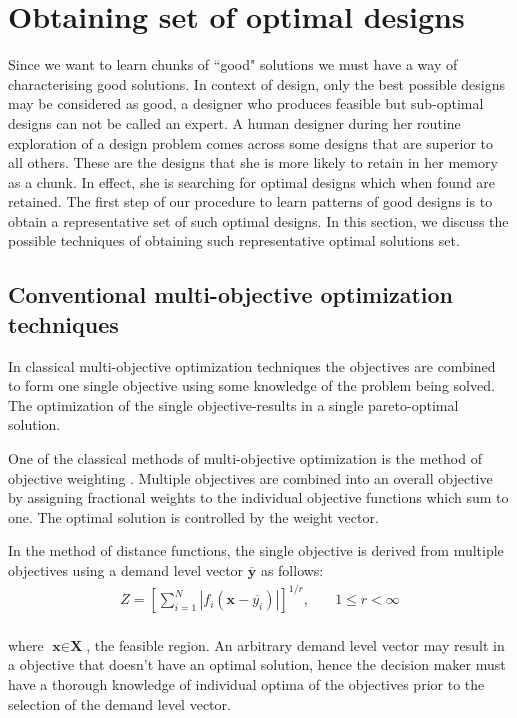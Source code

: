 \section{Obtaining set of optimal designs}
Since we want to learn chunks of ``good" solutions we must have a way of
characterising good solutions. In context of design, only the best possible
designs may be considered as good, a designer who produces feasible but
sub-optimal designs can not be called an expert. A human designer during
her routine exploration of a design problem comes across some designs that
are superior to all others. These are the designs that she is more likely
to retain in her memory as a chunk. In effect, she is searching for optimal
designs which when found are retained. The first step of our procedure to
learn patterns of good designs is to obtain a representative set of such
optimal designs.  In this section, we discuss the possible techniques of
obtaining such representative optimal solutions set.

\subsection{Conventional multi-objective optimization techniques}
In classical multi-objective optimization techniques the objectives are
combined to form one single objective using some knowledge of the problem
being solved. The optimization of the single objective-results in a single
pareto-optimal solution.

One of the classical methods of multi-objective optimization is the method
of objective weighting \citep{deb01,deb94}.  Multiple objectives are
combined into an overall objective by assigning fractional weights to the
individual objective functions which sum to one. The optimal solution is
controlled by the weight vector.

In the method of distance functions, the single objective is derived from
multiple objectives using a demand level vector $\overline{\textbf{y}}$ as
follows:\\
\begin{align}
  Z = \left[ \displaystyle\sum\limits_{i=1}^N {|f_i(\textbf{x} - \overline{y_i})|}\right] ^{1/r}, \quad &1 \leqslant r < \infty 
\end{align}\\
where $\textbf{x} \in \textbf{X}$, the feasible region. An arbitrary demand
level vector may result in a objective that doesn't have an optimal
solution, hence the decision maker must have a thorough knowledge of
individual optima of the objectives prior to the selection of the demand
level vector.


